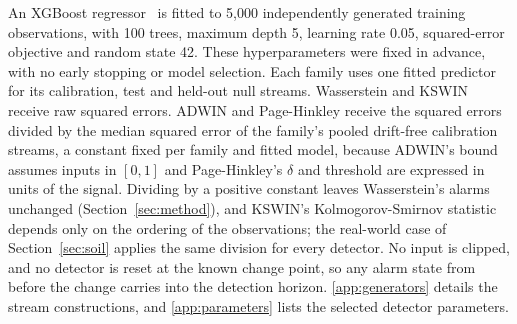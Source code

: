 \documentclass[preprint,12pt]{elsarticle}
\begin{document}
An XGBoost regressor~\cite{chen2016} is fitted to 5,000 independently generated training observations, with 100 trees, maximum depth 5, learning rate 0.05, squared-error objective and random state 42. These hyperparameters were fixed in advance, with no early stopping or model selection. Each family uses one fitted predictor for its calibration, test and held-out null streams. Wasserstein and KSWIN receive raw squared errors. ADWIN and Page-Hinkley receive the squared errors divided by the median squared error of the family's pooled drift-free calibration streams, a constant fixed per family and fitted model, because ADWIN's bound assumes inputs in $[0,1]$ and Page-Hinkley's $\delta$ and threshold are expressed in units of the signal. Dividing by a positive constant leaves Wasserstein's alarms unchanged (Section~\ref{sec:method}), and KSWIN's Kolmogorov-Smirnov statistic depends only on the ordering of the observations; the real-world case of Section~\ref{sec:soil} applies the same division for every detector. No input is clipped, and no detector is reset at the known change point, so any alarm state from before the change carries into the detection horizon. \ref{app:generators} details the stream constructions, and \ref{app:parameters} lists the selected detector parameters.
\end{document}
